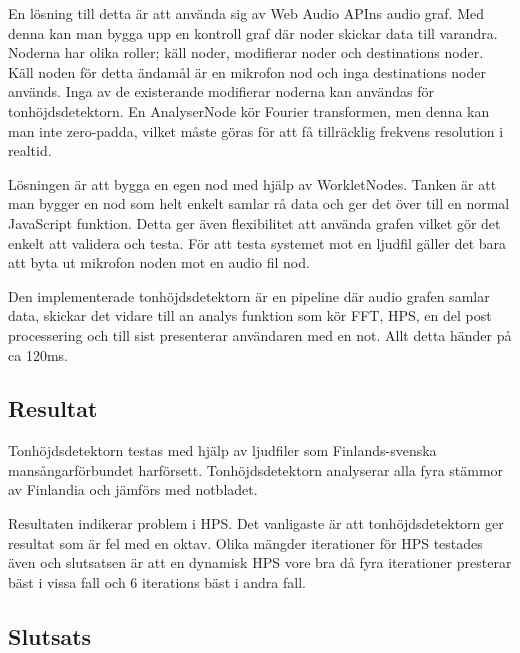 En lösning till detta är att använda sig av Web Audio APIns audio graf. Med denna kan man bygga upp en kontroll graf där noder skickar data till varandra. Noderna har olika roller; käll noder, modifierar noder och destinations noder. Käll noden för detta ändamål är en mikrofon nod och inga destinations noder används. Inga av de existerande modifierar noderna kan användas för tonhöjdsdetektorn. En AnalyserNode kör Fourier transformen, men denna kan man inte zero-padda, vilket måste göras för att få tillräcklig frekvens resolution i realtid. 

Lösningen är att bygga en egen nod med hjälp av WorkletNodes. Tanken är att man bygger en nod som helt enkelt samlar rå data och ger det över till en normal JavaScript funktion. Detta ger även flexibilitet att använda grafen vilket gör det enkelt att validera och testa. För att testa systemet mot en ljudfil gäller det bara att byta ut mikrofon noden mot en audio fil nod.  

Den implementerade tonhöjdsdetektorn är en pipeline där audio grafen samlar data, skickar det vidare till an analys funktion som kör FFT, HPS, en del post processering och till sist presenterar användaren med en not. Allt detta händer på ca 120ms. 
\subsection*{Resultat}
Tonhöjdsdetektorn testas med hjälp av ljudfiler som Finlands-svenska mansångarförbundet harförsett. Tonhöjdsdetektorn analyserar alla fyra stämmor av Finlandia och jämförs med notbladet. 

Resultaten indikerar problem i HPS. Det vanligaste är att tonhöjdsdetektorn ger resultat som är fel med en oktav. Olika mängder iterationer för HPS testades även och slutsatsen är att en dynamisk HPS vore bra då fyra iterationer presterar bäst i vissa fall och 6 iterations bäst i andra fall. 

\subsection*{Slutsats}
